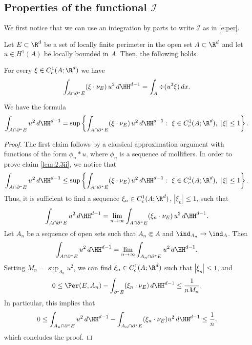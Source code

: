 \subsection{Properties of the functional $\mathcal I$}
We first notice that we can use an integration by parts to write $\mathcal I$ as in \eqref{e:per}.
\begin{lemma}\label{lem:2.3}
Let $E\subset\R^d$ be a set of locally finite perimeter in the open set $A\subset\R^d$ and let $u\in H^1(A)$ be locally bounded in $A$. Then, the following holds.
\begin{enumeratei}
\item\label{lem:2.3i} For every $\xi\in C^1_c(A;\R^d)$ we have
\begin{equation}\label{e:ipp}
\int_{A\cap\partial^\ast E}(\xi\cdot\nu_E)\, u^2\,d\HH^{d-1}=\int_{A}\div(u^2\xi)\,dx.
\end{equation}
\item\label{lem:2.3ii} We have the formula
\begin{equation}\label{e:formula}
\int_{A\cap\partial^\ast E}u^2\,d\HH^{d-1}=\sup\left\{\int_{A\cap\partial^\ast E}(\xi\cdot\nu_E)\, u^2\,d\HH^{d-1}:\ \xi\in C^1_c(A;\R^d),\ |\xi|\le 1\right\}.
\end{equation}
\end{enumeratei}
\end{lemma}
\begin{proof}
The first claim follows by a classical approximation argument with functions of the form $\phi_n\ast u$, where $\phi_n$ is a sequence of mollifiers. In order to prove claim \eqref{lem:2.3ii}, we notice that
\begin{equation*}
\int_{A\cap\partial^\ast E}u^2\,d\HH^{d-1}\le \sup\left\{\int_{A\cap\partial^\ast E}(\xi\cdot\nu_E)\, u^2\,d\HH^{d-1}:\ \xi\in C^1_c(A;\R^d),\ |\xi|\le 1\right\}.
\end{equation*}
Thus, it is sufficient to find a sequence $\xi_n\in C^1_c(A;\R^d)$, $|\xi_n|\le 1$, such that
\[\int_{A\cap\partial^\ast E}u^2\,d\HH^{d-1}= \lim_{n\to\infty}\int_{A\cap\partial^\ast E}(\xi_n\cdot\nu_E)\, u^2\,d\HH^{d-1}.\]
Let $A_n$ be a sequence of open sets such that $A_n\Subset A$ and $\ind_{A_n}\to\ind_A$.
Then
\[\int_{A\cap\partial^\ast E}u^2\,d\HH^{d-1}= \lim_{n\to\infty}\int_{A_n\cap\partial^\ast E}u^2\,d\HH^{d-1}.\]
Setting $M_n=\sup_{A_n} u^2$, we can find $\xi_n\in C^1_c(A;\R^d)$ such that $|\xi_n|\le 1$, and
\[0\le \Per(E,A_n)-\int_{\partial^\ast E}(\xi_n\cdot\nu_E)\,d\HH^{d-1}\le \frac1{nM_n}.\]
In particular, this implies that
\[0\le \int_{A_n\cap\partial^\ast E}u^2\,d\HH^{d-1}-\int_{A_n\cap\partial^\ast E}(\xi_n\cdot \nu_E)u^2\,d\HH^{d-1}\le \frac1n,\]
which concludes the proof.
\end{proof}
